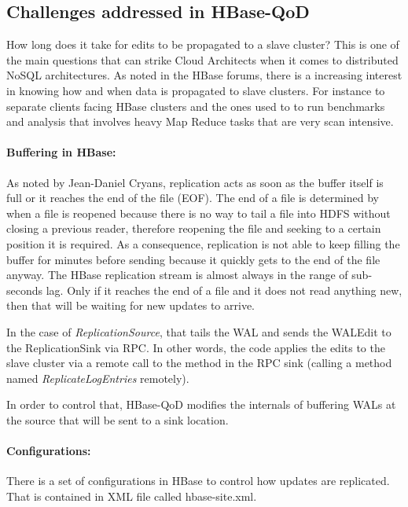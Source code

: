 \subsection{Challenges addressed in HBase-QoD}

How long does it take for edits to be propagated to a slave cluster? This is one of the main questions that can strike Cloud Architects when it comes to distributed NoSQL architectures. As noted in the HBase forums, there is a increasing interest in knowing how and when data is propagated to slave clusters. For instance to separate clients facing HBase clusters and the ones used to to run benchmarks and analysis that involves heavy Map Reduce tasks that are very scan intensive.

\paragraph*{Buffering in HBase:}
As noted by Jean-Daniel Cryans, replication acts as soon as the buffer itself is full or it reaches the end of the file (EOF). The end of a file is determined by when a file is reopened because there is no way to tail a file into HDFS without closing a previous reader, therefore reopening the file and seeking to a certain position it is required. As a consequence, replication is not able to keep filling the buffer for minutes before sending because it quickly gets to the end of the file anyway. The HBase replication stream is almost always in the range of sub-seconds lag. Only if it reaches the end of a file and it does not read anything new, then that will be waiting for new updates to arrive.

In the case of \emph{ReplicationSource}, that tails the WAL and sends the WALEdit to the ReplicationSink via RPC. In other words, the code applies the edits to the slave cluster via a remote call to the method in the RPC sink (calling a method named \emph{ReplicateLogEntries} remotely).

In order to control that, HBase-QoD modifies the internals of buffering WALs at the source that will be sent to a sink location.

\paragraph*{Configurations:}
There is a set of configurations in HBase to control how updates are replicated. That is contained in XML file called hbase-site.xml.

